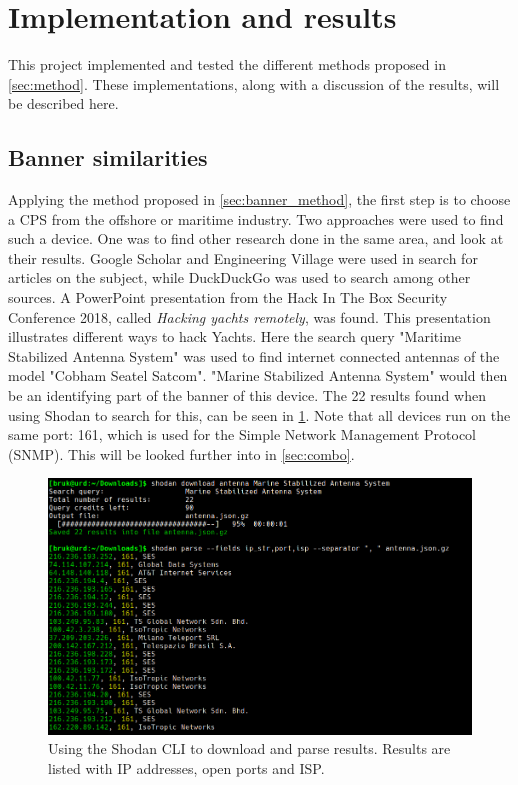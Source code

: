 \section{Implementation and results} \label{sec:results}
This project implemented and tested the different methods proposed in \cref{sec:method}. These implementations, along with a discussion of the results, will be described here. 

\subsection{Banner similarities} \label{sec:banner_results}
Applying the method proposed in \cref{sec:banner_method}, the first step is to choose a CPS from the offshore or maritime industry. Two approaches were used to find such a device. One was to find other research done in the same area, and look at their results. Google Scholar\cite{google_scholar} and Engineering Village\cite{engineering_village} were used in search for articles on the subject, while DuckDuckGo\cite{ddg} was used to search among other sources. A PowerPoint presentation from the Hack In The Box Security Conference 2018, called \textit{Hacking yachts remotely}, was found. This presentation illustrates different ways to hack Yachts. Here the search query "Maritime Stabilized Antenna System" was used to find internet connected antennas of the model "Cobham Seatel Satcom". 
"Marine Stabilized Antenna System" would then be an identifying part of the banner of this device. The 22 results found when using Shodan to search for this, can be seen in \cref{fig:banner_parsing}. Note that all devices run on the same port: 161, which is used for the Simple Network Management Protocol (SNMP). This will be looked further into in \cref{sec:combo}.

\begin{figure} [H]
    \centering
    \includegraphics[scale=0.4]{Figurer/banner_parsing.png}
    \caption{Using the Shodan CLI to download and parse results. Results are listed with IP addresses, open ports and ISP.}
    \label{fig:banner_parsing}
\end{figure}

